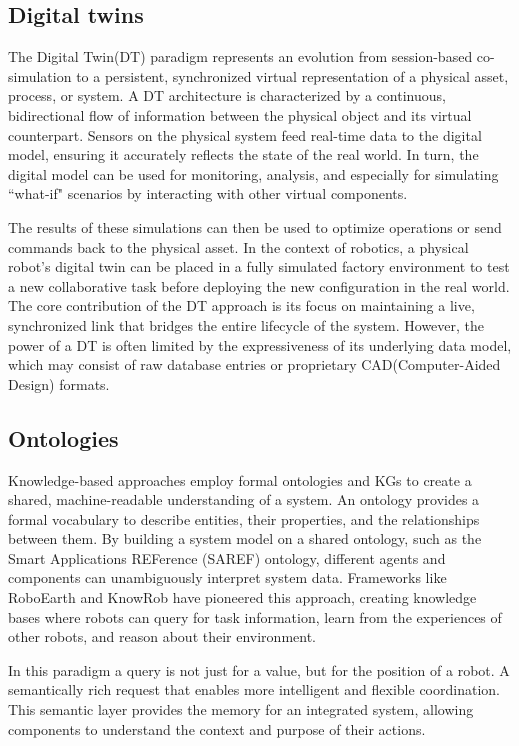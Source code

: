 \documentclass{article} %
\begin{document}
\subsection{Digital twins}
The Digital Twin(DT) paradigm represents an evolution from session-based co-simulation to a persistent, synchronized virtual representation of a physical asset, process, or system\cite{grieves2014digital}. A DT architecture is characterized by a continuous, bidirectional flow of information between the physical object and its virtual counterpart. Sensors on the physical system feed real-time data to the digital model, ensuring it accurately reflects the state of the real world. In turn, the digital model can be used for monitoring, analysis, and especially for simulating ``what-if" scenarios by interacting with other virtual components. 

The results of these simulations can then be used to optimize operations or send commands back to the physical asset\cite{cimino2019digital}. In the context of robotics, a physical robot's digital twin can be placed in a fully simulated factory environment to test a new collaborative task before deploying the new configuration in the real world. The core contribution of the DT approach is its focus on maintaining a live, synchronized link that bridges the entire lifecycle of the system. However, the power of a DT is often limited by the expressiveness of its underlying data model, which may consist of raw database entries or proprietary CAD(Computer-Aided Design) formats.

\subsection{Ontologies}
Knowledge-based approaches employ formal ontologies and KGs to create a shared, machine-readable understanding of a system. An ontology provides a formal vocabulary to describe entities, their properties, and the relationships between them\cite{gruber1993translation}. By building a system model on a shared ontology, such as the Smart Applications REFerence (SAREF) ontology\cite{garcia2023etsi}, different agents and components can unambiguously interpret system data. Frameworks like RoboEarth and KnowRob have pioneered this approach, creating knowledge bases where robots can query for task information, learn from the experiences of other robots, and reason about their environment\cite{waibel2011roboearth, beetz2018knowrob}. 

In this paradigm a query is not just for a value, but for the position of a robot. A semantically rich request that enables more intelligent and flexible coordination. This semantic layer provides the memory for an integrated system, allowing components to understand the context and purpose of their actions.
\end{document}
